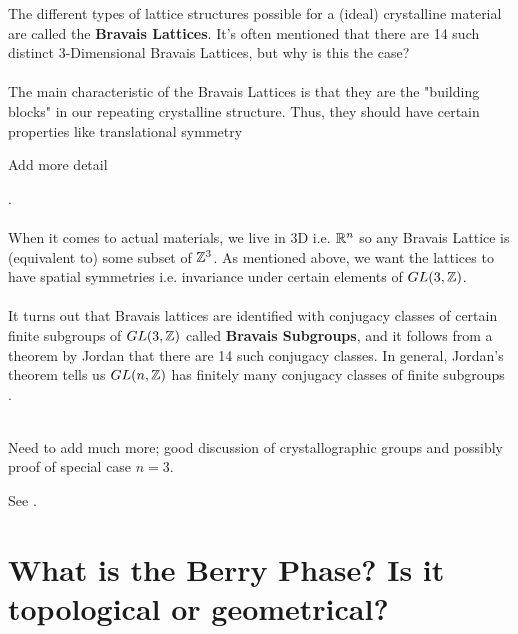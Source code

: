 \documentclass[11pt]{article}
\begin{document}
The different types of lattice structures possible for a (ideal) crystalline material are called the \textbf{Bravais Lattices}. It's often mentioned that there are 14 such distinct 3-Dimensional Bravais Lattices, but why is this the case? 
\\
\\
The main characteristic of the Bravais Lattices is that they are the "building blocks" in our repeating crystalline structure. Thus, they should have certain properties like translational symmetry \begin{note}{Add more detail}\end{note}.
\\
\\ 
When it comes to actual materials, we live in 3D i.e. $\mathbb{R}^n$ so any Bravais Lattice is (equivalent to) some subset of $\mathbb{Z}^3$. As mentioned above, we want the lattices to have spatial symmetries i.e. invariance under certain elements of $GL(3, \mathbb{Z})$.
\\
\\
It turns out that Bravais lattices are identified with conjugacy classes of certain finite subgroups of $GL(3,\mathbb{Z})$ called \textbf{Bravais Subgroups}, and it follows from a theorem by Jordan that there are 14 such conjugacy classes. In general, Jordan's theorem tells us $GL(n, \mathbb{Z})$ has finitely many conjugacy classes of finite subgroups \cite{Burde13}.
\\
\\
\begin{thought}
{Need to add much more; good discussion of crystallographic groups and possibly proof of special case $n=3$.}
\end{thought} See \cite{Whitman11}.



\newpage
\section{What is the Berry Phase? Is it topological or geometrical?}
\end{document}
